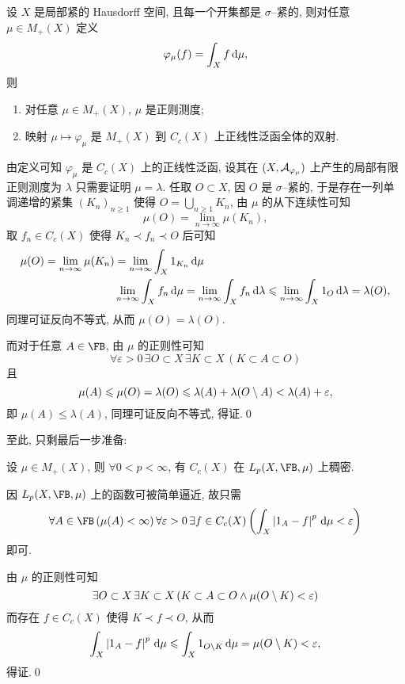 	\begin{Proposition}
		设 $ X $ 是局部紧的 Hausdorff 空间, 且每一个开集都是 $ \sigma $--紧的, 则对任意 $ \mu\in M_+(X) $ 定义
		\[
			\varphi_\mu(f)=\int_Xf\,\mathrm{d}\mu,
		\]
		则
		\begin{enumerate}[(1)]
			\item 对任意 $ \mu\in M_+(X) $, $ \mu $ 是正则测度;
			\item 映射 $ \mu\mapsto\varphi_\mu $ 是 $ M_+(X) $ 到 $ C_c(X) $ 上正线性泛函全体的双射.
		\end{enumerate}
	\end{Proposition}
	\begin{Proof}
		由定义可知 $ \varphi_\mu $ 是 $ C_c(X) $ 上的正线性泛函, 设其在 $ (X,\mathcal{A}_{\varphi_\mu}) $ 上产生的局部有限正则测度为 $ \lambda $ 只需要证明 $ \mu=\lambda $. 任取 $ O\subset X $, 因 $ O $ 是 $ \sigma $--紧的, 于是存在一列单调递增的紧集 $ (K_n)_{n\geqslant 1} $ 使得 $ O=\bigcup\limits_{n\geqslant 1}K_n $, 由 $ \mu $ 的从下连续性可知
		\[
			\mu(O)=\lim_{n\to\infty}\mu(K_n),
		\]
		取 $ f_n\in C_c(X) $ 使得 $ K_n\prec f_n\prec O $ 后可知
		\[
			\begin{aligned}
				\mu(O)=\lim_{n\to\infty}\mu(K_n)&=\lim_{n\to\infty}\int_X1_{K_n}\,\mathrm{d}\mu\\
				&\lim_{n\to\infty}\int_Xf_n\,\mathrm{d}\mu=\lim_{n\to\infty}\int_Xf_n\,\mathrm{d}\lambda\leqslant\lim_{n\to\infty}\int_X1_O\,\mathrm{d}\lambda=\lambda(O),
			\end{aligned}
		\]
		同理可证反向不等式, 从而 $ \mu(O)=\lambda(O) $.

		而对于任意 $ A\in\FB $, 由 $ \mu $ 的正则性可知
		\[
			\forall\varepsilon>0\,\exists O\subset X\,\exists K\subset X\,(K\subset A\subset O)
		\]
		且
		\[
			\mu(A)\leqslant\mu(O)=\lambda(O)\leqslant\lambda(A)+\lambda(O\setminus A)<\lambda(A)+\varepsilon,
		\]
		即 $ \mu(A)\leqslant\lambda(A) $, 同理可证反向不等式, 得证.\qed
	\end{Proof}

	至此, 只剩最后一步准备:

	\begin{Proposition}
		设 $ \mu\in M_+(X) $, 则 $ \forall 0<p<\infty $, 有 $ C_c(X) $ 在 $ L_p(X,\FB,\mu) $ 上稠密.
	\end{Proposition}
	\begin{Proof}
		因 $ L_p(X,\FB,\mu) $ 上的函数可被简单逼近, 故只需
		\[
			\forall A\in\FB\,(\mu(A)<\infty)\,\forall \varepsilon>0\,\exists f\in C_c(X)\left( \int_X\abs{1_A-f}^p\diff\mu<\varepsilon \right)
		\]
		即可.

		由 $ \mu $ 的正则性可知
		\[
			\exists O\subset X\,\exists K\subset X\,(K\subset A\subset O\land\mu(O\setminus K)<\varepsilon)
		\]
		而存在 $ f\in C_c(X) $ 使得 $ K\prec f\prec O $, 从而
		\[
			\int_X\left| 1_A-f \right| ^p\,\mathrm{d}\mu\leqslant\int_X1_{O\setminus K}\,\mathrm{d}\mu=\mu(O\setminus K)<\varepsilon,
		\]
		得证.\qed
	\end{Proof}

